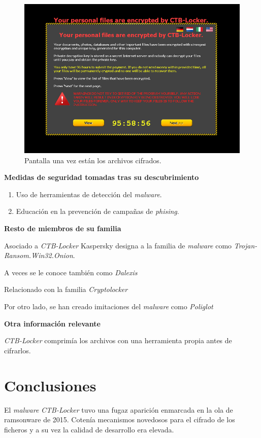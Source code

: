 \documentclass[11pt,a4paper]{article}
\begin{document}
\begin{figure}
  \caption{Pantalla una vez están los archivos cifrados.}
  \label{fig:2}
  \centering
  \includegraphics[width=\textwidth]{ctblocker_lockscreen.png}
\end{figure}

  \begin{center}
    \textbf{Medidas de seguridad tomadas tras su descubrimiento}
  \end{center}

\begin{enumerate}
\item Uso de herramientas de detección del \emph{malware}.
\item Educación en la prevención de campañas de \emph{phising}.
\end{enumerate}

  \begin{center}
    \textbf{Resto de miembros de su familia}
  \end{center}

Asociado a \emph{CTB-Locker} Kaspersky designa a la familia de \emph{malware} como \emph{Trojan-Ransom.Win32.Onion}.

A veces se le conoce también como \emph{Dalexis} \cite{FS2}

Relacionado con la familia \emph{Cryptolocker} \cite{FSecure}

Por otro lado, se han creado imitaciones del \emph{malware} como \emph{Poliglot} \cite[p.~11]{Kas16}

  \begin{center}
    \textbf{Otra información relevante}
  \end{center}

\emph{CTB-Locker} comprimía los archivos con una herramienta propia antes de cifrarlos. \cite{Point}

\section{Conclusiones}
\label{sec:conclusiones}

El \emph{malware} \emph{CTB-Locker} tuvo una fugaz aparición enmarcada en la ola de ramsonware de 2015. Cotenía mecanismos novedosos para el cifrado de los ficheros y a su vez la calidad de desarrollo era elevada.


\end{document}
